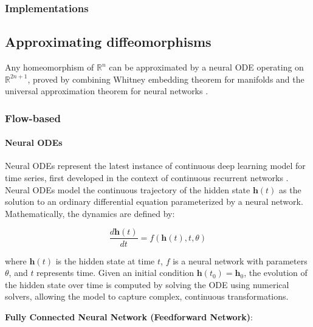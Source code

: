 \documentclass{article}
\theoremstyle{definition} \newtheorem{definition}{Definition}  \newtheorem{example}{Example}
\theoremstyle{remark} \newtheorem{remark}{Remark}
\newcounter{ct}
\begin{document}
\subsubsection{Implementations}



\subsection{Approximating diffeomorphisms}\label{sec:diffeomorphisms}
Any homeomorphism of $\mathbb {R} ^{n}$ can be approximated by a neural ODE operating on $\mathbb {R} ^{2n+1}$, proved by combining Whitney embedding theorem for manifolds and the universal approximation theorem for neural networks  \citep{zhang2020approximation}.


\subsubsection{Flow-based}
\paragraph{Neural ODEs}
Neural ODEs \citep{chen2018neural} represent the latest instance of continuous deep learning model for time series, first developed in the context of continuous recurrent networks \citep{cohen1983absolute}.
%
Neural ODEs model the continuous trajectory of the hidden state \( \mathbf{h}(t) \) as the solution to an ordinary differential equation parameterized by a neural network. Mathematically, the dynamics are defined by:

\[
\frac{d \mathbf{h}(t)}{dt} = f(\mathbf{h}(t), t, \theta)
\]

where \( \mathbf{h}(t) \) is the hidden state at time \( t \), \( f \) is a neural network with parameters \( \theta \), and \( t \) represents time. Given an initial condition \( \mathbf{h}(t_0) = \mathbf{h}_0 \), the evolution of the hidden state over time is computed by solving the ODE using numerical solvers, allowing the model to capture complex, continuous transformations.

\textbf{Fully Connected Neural Network (Feedforward Network)}:
\end{document}
